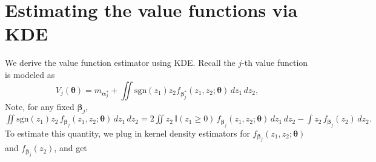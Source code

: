 \documentclass[12pt]{article}
\newcommand{\bs}{ \boldsymbol}
\newcommand{\txt}{\text}
\newcommand{\lt}{\left}
\newcommand{\rt}{\right}
\newcommand{\tsgn}{\txt{sgn}}
\begin{document}
\section{Estimating the value functions via KDE}
We derive the value function estimator using KDE. Recall the $j$-th value function is modeled as $$V_j\lt(\bs{\theta}\rt) = m_{\bs{\alpha}^*_j}+ \iint \tsgn\lt(z_1\rt)z_2 f_{\bs{\beta}^*_j}\lt(z_1, z_2; \bs{\theta}\rt) \,dz_1 \,dz_2,$$ 
Note, for any fixed $\bs{\beta}_j$, {\small$\iint\text{sgn}(z_1)z_2\,f_{\bs{\beta}_j}\left(z_1,z_2;\bs{\theta}\right)\,dz_1\,dz_2 =  2\iint z_2\,\mathbb{I}\left(z_1\ge0\right)\,f_{\bs{\beta}_j}\left(z_1, z_2;\bs{\theta}\right)\,dz_1\,dz_2-\int z_2\,f_{\bs{\beta}_{j}}\left(z_2\right)\,dz_2.$} To estimate this quantity, we plug in kernel density estimators for $f_{\bs{\beta}_j}(z_1, z_2; \bs{\theta})$
and $f_{\bs{\beta}_j}( z_2 )$, and get
\end{document}
